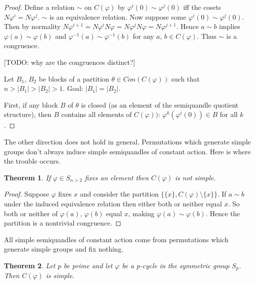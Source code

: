 \documentclass{amsart}
\newtheorem{thm}{Theorem}[section]
\theoremstyle{definition}
\numberwithin{equation}{section}
\begin{document}
\begin{proof}
Define a relation $\sim$ on $C(\varphi)$ by $\varphi^{i}(0) \sim
\varphi^{j}(0)$ iff the cosets $N\varphi^{i} = N\varphi^{j}$. $\sim$
is an equivalence relation. Now suppose some $\varphi^{i}(0) \sim
\varphi^{j}(0)$. Then by normality $N\varphi^{i+1} = N\varphi^{i}N\varphi
= N\varphi^{j}N\varphi = N\varphi^{j+1}$. Hence $a \sim b$ implies
$\varphi(a) \sim \varphi(b)$ and $\varphi^{-1}(a) \sim \varphi^{-1}(b)$
for any $a$, $b \in C(\varphi)$. Thus $\sim$ is a congruence.

[TODO: why are the congruences distinct?]

\bigskip

Let $B_1$, $B_2$ be blocks of a partition $\theta \in Con(C(\varphi))$
such that $n > \left|B_1\right| > \left|B_2\right| > 1$. Goal:
$\left|B_1\right| = \left|B_2\right|$.

\bigskip

First, if any block $B$ of $\theta$ is closed (as an element of the
semiquandle quotient structure), then $B$ contains all elements of
$C(\varphi))$: $\varphi^k(\varphi^i(0)) \in B$ for all $k$.

\bigskip


\end{proof}

The other direction does not hold in general. Permutations which
generate simple groups don't always induce simple semiquandles of
constant action. Here is where the trouble occurs.

\begin{thm}
If $\varphi \in S_{n > 2}$ fixes an element then $C(\varphi)$ is
not simple.
\end{thm}

\begin{proof}
Suppose $\varphi$ fixes $x$ and consider the partition $\{ \{x\},
C(\varphi) \setminus \{x\} \}$.  If $a \sim b$ under the induced
equivalence relation then either both or neither equal $x$.  So
both or neither of $\varphi(a)$, $\varphi(b)$ equal $x$, making
$\varphi(a) \sim \varphi(b)$.  Hence the partition is a nontrivial
congruence.
\end{proof}

All simple semiquandles of constant action come from permutations
which generate simple groups and fix nothing.

\begin{thm}
Let $p$ be prime and let $\varphi$ be a p-cycle in the symmetric
group $S_p$.  Then $C(\varphi)$ is simple.
\end{thm}
\end{document}
